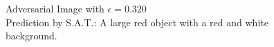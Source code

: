 \begin{figure}[ht]
\begin{minipage}{0.45\textwidth}
        \caption*{Adversarial Image with $\epsilon=0.320$\\Prediction by S.A.T.: A large red object with a red and white background.}
    \end{minipage}
\end{figure}